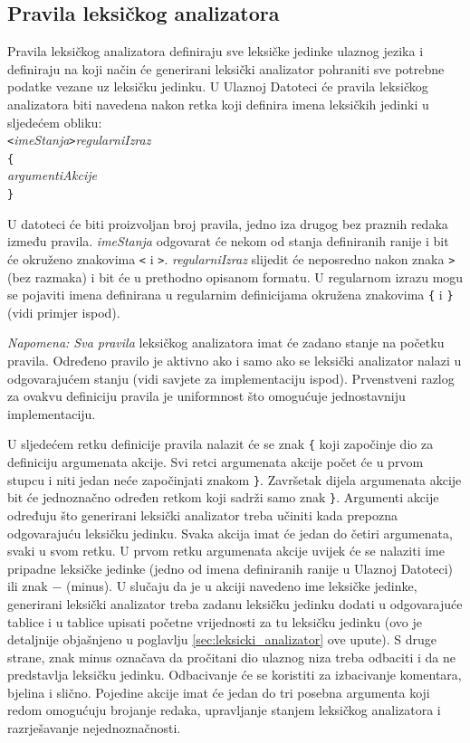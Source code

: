 \documentclass[times, 12pt, utf8]{book}
\begin{document}
\begin{lstlisting}[caption={Primjer imena stanja u Ulaznoj Datoteci.},label=lst:imena_jedinki]
%L IDENTIFIKATOR brojcanaKonstanta znakovnaKonstanta OP_PLUS
\end{lstlisting}

\subsection{Pravila leksičkog analizatora}
Pravila leksičkog analizatora definiraju sve leksičke jedinke ulaznog jezika i definiraju na koji način će generirani leksički analizator pohraniti sve potrebne podatke vezane uz leksičku jedinku.
U Ulaznoj Datoteci će pravila leksičkog analizatora biti navedena nakon retka koji definira imena leksičkih jedinki u sljedećem obliku:\\
\verb=<=\emph{imeStanja}\verb=>=\emph{regularniIzraz}\\
\verb|{|\\
\emph{argumentiAkcije}\\
\verb|}|

U datoteci će biti proizvoljan broj pravila, jedno iza drugog bez praznih redaka između pravila.
\emph{imeStanja} odgovarat će nekom od stanja definiranih ranije i bit će okruženo znakovima \verb|<| i \verb|>|.
\emph{regularniIzraz} slijedit će neposredno nakon znaka \verb|>| (bez razmaka) i bit će u prethodno opisanom formatu.
U regularnom izrazu mogu se pojaviti imena definirana u regularnim definicijama okružena znakovima \verb|{| i \verb|}| (vidi primjer ispod).

\emph{Napomena: Sva pravila} leksičkog analizatora imat će zadano stanje na početku pravila.
Određeno pravilo je aktivno ako i samo ako se leksički analizator nalazi u odgovarajućem stanju (vidi savjete za implementaciju ispod).
Prvenstveni razlog za ovakvu definiciju pravila je uniformnost što omogućuje jednostavniju implementaciju.

U sljedećem retku definicije pravila nalazit će se znak \verb|{| koji započinje dio za definiciju argumenata akcije.
Svi retci argumenata akcije počet će u prvom stupcu i niti jedan neće započinjati znakom \verb|}|.
Završetak dijela argumenata akcije bit će jednoznačno određen retkom koji sadrži samo znak \verb|}|.
Argumenti akcije određuju što generirani leksički analizator treba učiniti kada prepozna odgovarajuću leksičku jedinku.
Svaka akcija imat će jedan do četiri argumenata, svaki u svom retku.
U prvom retku argumenata akcije uvijek će se nalaziti ime pripadne leksičke jedinke (jedno od imena definiranih ranije u Ulaznoj Datoteci) ili znak \(-\) (minus).
U slučaju da je u akciji navedeno ime leksičke jedinke, generirani leksički analizator treba zadanu leksičku jedinku dodati u odgovarajuće tablice i u tablice upisati početne vrijednosti za tu leksičku jedinku (ovo je detaljnije objašnjeno u poglavlju \ref{sec:leksicki_analizator} ove upute).
S druge strane, znak minus označava da pročitani dio ulaznog niza treba odbaciti i da ne predstavlja leksičku jedinku.
Odbacivanje će se koristiti za izbacivanje komentara, bjelina i slično.
Pojedine akcije imat će jedan do tri posebna argumenta koji redom omogućuju brojanje redaka, upravljanje stanjem leksičkog analizatora i razrješavanje nejednoznačnosti.
\end{document}
